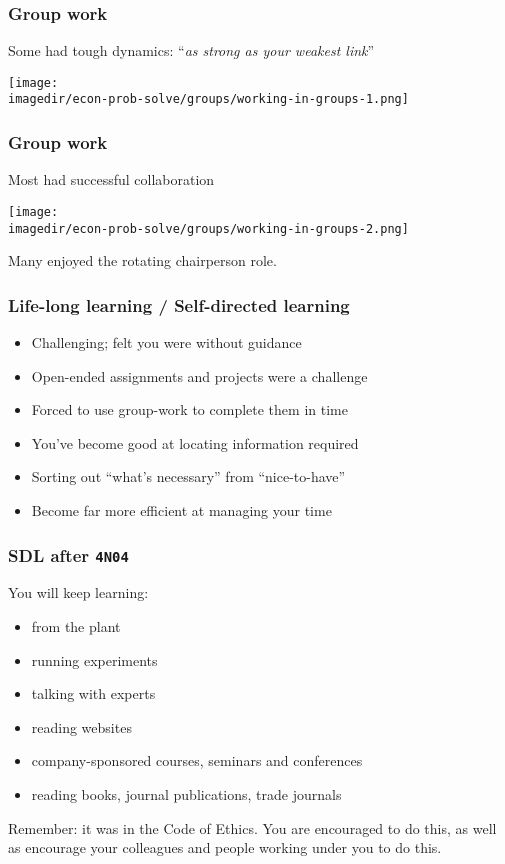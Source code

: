 \begin{frame}\frametitle{Group work}
	Some had tough dynamics: ``\emph{as strong as your weakest link}''
	
	\begin{center}
		\texttt{[image: \\imagedir/econ-prob-solve/groups/working-in-groups-1.png]}
	\end{center}
\end{frame}

\begin{frame}\frametitle{Group work}
	Most had successful collaboration
	\begin{center}
		\texttt{[image: \\imagedir/econ-prob-solve/groups/working-in-groups-2.png]}
	\end{center}


	Many enjoyed the rotating chairperson role.

\end{frame}

\begin{frame}\frametitle{Life-long learning / Self-directed learning}
	\begin{itemize}
		\item	Challenging; felt you were without guidance
		\item	Open-ended assignments and projects were a challenge
		\item	Forced to use group-work to complete them in time
		\item	You've become good at locating information required
		\item	Sorting out ``what's necessary'' from ``nice-to-have''
		\item	Become far more efficient at managing your time
	\end{itemize}
\end{frame}

\begin{frame}\frametitle{SDL after \texttt{4N04}}
	You will keep learning:
	\begin{itemize}
		\item	from the plant
		\item	running experiments
		\item	talking with experts
		\item	reading websites
		\item	company-sponsored courses, seminars and conferences 
		\item	reading books, journal publications, trade journals
	\end{itemize}
	
	\vspace{12pt}
	Remember: it was in the Code of Ethics. You are encouraged to do this, as well as encourage your colleagues and people working under you to do this.
\end{frame}

